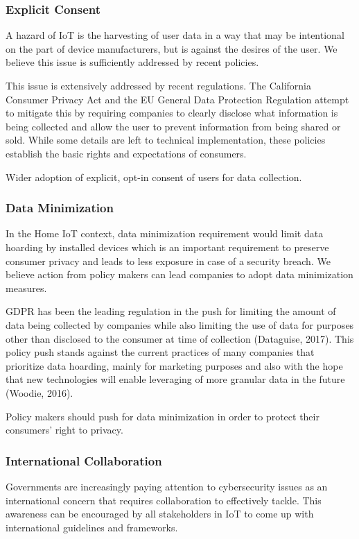 \subsubsection{Explicit Consent}
A hazard of IoT is the harvesting of user data in a way that may be intentional on the part of device manufacturers, but is against the desires of the user. We believe this issue is sufficiently addressed by recent policies.

 This issue is extensively addressed by recent regulations. The California Consumer Privacy Act and the EU General Data Protection Regulation attempt to mitigate this by requiring companies to clearly disclose what information is being collected and allow the user to prevent information from being shared or sold. While some details are left to technical implementation, these policies establish the basic rights and expectations of consumers. 

 Wider adoption of explicit, opt-in consent of users for data collection.


\subsubsection{Data Minimization}
In the Home IoT context, data minimization requirement would limit data hoarding by installed devices which is an important requirement to preserve consumer privacy and leads to less exposure in case of a security breach. We believe action from policy makers can lead companies to adopt data minimization measures. 

 GDPR has been the leading regulation in the push for limiting the amount of data being collected by companies while also limiting the use of data for purposes other than disclosed to the consumer at time of collection (Dataguise, 2017). This policy push stands against the current practices of many companies that prioritize data hoarding, mainly for marketing purposes and also with the hope that new technologies will enable leveraging of more granular data in the future (Woodie, 2016).

 Policy makers should push for data minimization in order to protect their consumers’ right to privacy. 

\subsubsection{International Collaboration}
Governments are increasingly paying attention to cybersecurity issues as an international concern that requires collaboration to effectively tackle. This awareness can be encouraged by all stakeholders in IoT to come up with international guidelines and frameworks.

